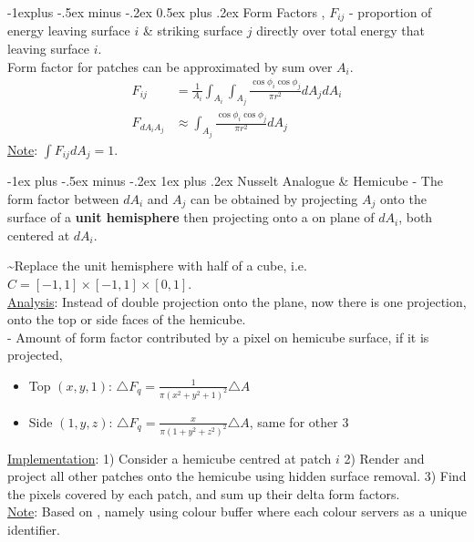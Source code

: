 \documentclass[10pt,landscape,letterpaper]{article}
\makeatletter
\renewcommand{\subsection}{\@startsection{subsection}{2}{0mm}%
                                {-1explus -.5ex minus -.2ex}%
                                {0.5ex plus .2ex}%
                                {\sffamily\normalsize\itshape}}
\renewcommand{\subsubsection}{\@startsection{subsubsection}{3}{0mm}%
                                {-1ex plus -.5ex minus -.2ex}%
                                {1ex plus .2ex}%
                                {\normalfont\small\itshape}}
\makeatother
\begin{document}
\begin{multicols}{3}
\subsection{Form Factors}
, $F_{ij}$ - proportion of energy leaving surface $i$ \& striking surface $j$ directly over total energy that leaving surface $i$.
\\
Form factor for patches can be approximated by sum over $A_i$.
\[
\begin{aligned}
F_{ij} &= \frac{1}{A_i} \int_{A_i} \int_{A_j} \frac{\cos \phi_i \cos \phi_j}{\pi r^2} dA_j dA_i
\\
F_{dA_iA_j} &\approx \int_{A_j} \frac{\cos \phi_i \cos \phi_j}{\pi r^2} dA_j
\end{aligned}
\]
\underline{Note}: $\int F_{ij} dA_j = 1$.

\subsubsection{Nusselt Analogue \& Hemicube}
 - The form factor between $dA_i$ and $A_j$ can be obtained by projecting $A_j$ onto the surface of a \textbf{unit hemisphere} then projecting onto a  on plane of $dA_i$, both centered at $dA_i$.

\smallskip

 \textasciitilde Replace the unit hemisphere with half of a cube, i.e. $C = [-1, 1]\times[-1, 1]\times [0, 1]$.
\\
\underline{Analysis}: Instead of double projection onto the plane, now there is one projection, onto the top or side faces of the hemicube.
\\
 - Amount of form factor contributed by a pixel on hemicube surface, if it is projected,
\begin{itemize}
    \item Top $(x, y, 1)$: $\triangle F_q = \frac{1}{\pi(x^2+y^2+1)^2} \triangle A$
    \item Side $(1, y, z)$: $\triangle F_q = \frac{x}{\pi(1+y^2+z^2)^2} \triangle A$, same for other 3
\end{itemize}
\underline{Implementation}: 1) Consider a hemicube centred at patch $i$ 2) Render and project all other patches onto the hemicube using hidden surface removal. 3) Find the pixels covered by each patch, and sum up their delta form factors.
\\
\underline{Note}: Based on , namely using colour buffer where each colour servers as a unique identifier.



\end{multicols}
\end{document}
